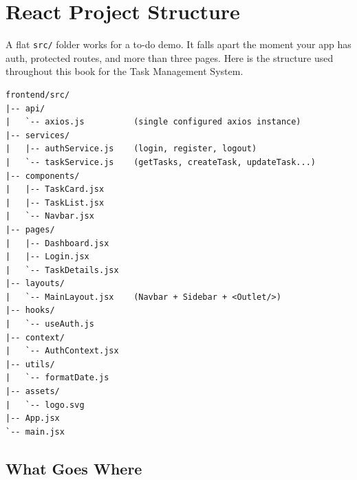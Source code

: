 \chapter{React Project Structure}

A flat \texttt{src/} folder works for a to-do demo. It falls apart the moment
your app has auth, protected routes, and more than three pages. Here is the
structure used throughout this book for the Task Management System.

\begin{diagrambox}
\begin{verbatim}
frontend/src/
|-- api/
|   `-- axios.js          (single configured axios instance)
|-- services/
|   |-- authService.js    (login, register, logout)
|   `-- taskService.js    (getTasks, createTask, updateTask...)
|-- components/
|   |-- TaskCard.jsx
|   |-- TaskList.jsx
|   `-- Navbar.jsx
|-- pages/
|   |-- Dashboard.jsx
|   |-- Login.jsx
|   `-- TaskDetails.jsx
|-- layouts/
|   `-- MainLayout.jsx    (Navbar + Sidebar + <Outlet/>)
|-- hooks/
|   `-- useAuth.js
|-- context/
|   `-- AuthContext.jsx
|-- utils/
|   `-- formatDate.js
|-- assets/
|   `-- logo.svg
|-- App.jsx
`-- main.jsx
\end{verbatim}
\end{diagrambox}

\section{What Goes Where}

